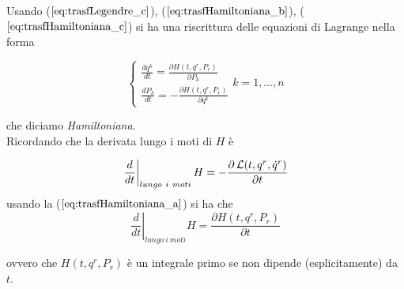 Usando ($ \ref{eq:trasfLegendre_c} $), ($ \ref{eq:trasfHamiltoniana_b} $), ($ \ref{eq:trasfHamiltoniana_c} $) si ha una riscrittura delle equazioni di Lagrange nella forma

\begin{equation}
  \begin{cases}
    \frac{d q^k}{d t} = \frac{\partial H(t, q^r, P_r)}{\partial P_k}\\
    \frac{d P_k}{d t} = - \frac{\partial H(t, q^r, P_r)}{\partial q^k}
  \end{cases}
  k = 1, \dots, n 
\end{equation}

che diciamo \textit{Hamiltoniana}.\\
Ricordando che la derivata lungo i moti di $ H $ è

\begin{equation*}
  \left. \frac{d}{d t} \right|_{lungo ~ i ~ moti} H = - \frac{\partial \operatorname{\mathcal{L}} (t, q^r, \dot{q}^r)}{\partial t}
\end{equation*}
usando la ($ \ref{eq:trasfHamiltoniana_a} $) si ha che
\begin{equation*}
  \left. \frac{d}{d t} \right|_{lungo ~ i ~ moti} H = \frac{\partial H(t, q^r, P_r)}{\partial t}
\end{equation*}

ovvero che $ H (t, q^r, P_r) $ è un integrale primo se non dipende (esplicitamente) da $ t $.
